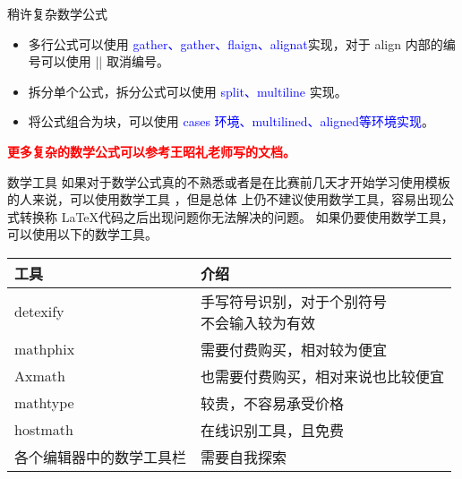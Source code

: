 \begin{frame}[fragile]{稍许复杂数学公式}
\begin{itemize}
	\item 	多行公式可以使用  \textcolor{blue}{gather、gather\*、flaign、alignat}实现，对于 align 内部的编号可以使用
	|\notag| 取消编号。
	\item 拆分单个公式，拆分公式可以使用 \textcolor{blue}{split、multiline} 实现。
	\item 将公式组合为块，可以使用 \textcolor{blue}{cases 环境、multilined、aligned等环境实现}。  \\
\end{itemize}
\phantom{幻影幻影} \textcolor{red}{\bfseries 更多复杂的数学公式可以参考王昭礼老师写的文档。}
\end{frame}

\begin{frame}[fragile]{数学工具}
\phantom{幻影}如果对于数学公式真的不熟悉或者是在比赛前几天才开始学习使用模板的人来说，可以使用数学工具
，但是总体
上仍不建议使用数学工具，容易出现公式转换称 \LaTeX 代码之后出现问题你无法解决的问题。
\phantom{幻影}如果仍要使用数学工具，可以使用以下的数学工具。
	\begin{table}
\begin{tabular}{ll}
\toprule	
工具		&			介绍		\\
\midrule
detexify	&		\makecell[l]{手写符号识别，对于个别符号\\不会输入较为有效} \\
mathphix	&	  需要付费购买，相对较为便宜		\\
Axmath		&	   也需要付费购买，相对来说也比较便宜	\\
mathtype	&	    较贵，不容易承受价格		\\
hostmath	&		在线识别工具，且免费		\\
各个编辑器中的数学工具栏		&			需要自我探索	\\
\bottomrule	
\end{tabular}
	\end{table}
\end{frame}